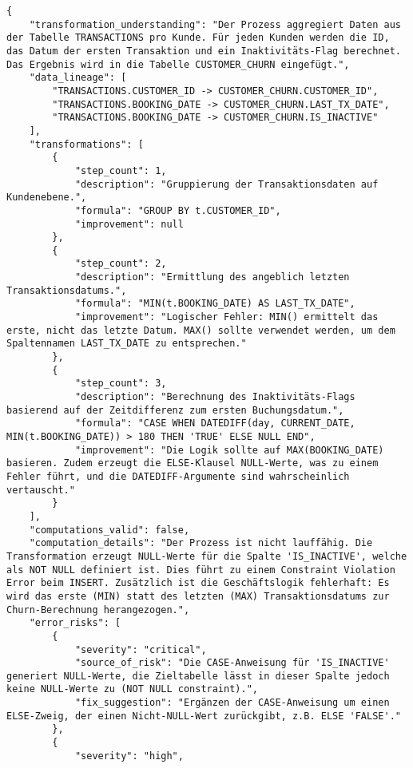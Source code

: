 \begin{lstlisting}[caption={Ausgabe: GEMINI 2.5 Pro Anwendungsfall 7 Hauptdurchlauf},label={gemini_case7_prompt1}]
{
    "transformation_understanding": "Der Prozess aggregiert Daten aus der Tabelle TRANSACTIONS pro Kunde. Für jeden Kunden werden die ID, das Datum der ersten Transaktion und ein Inaktivitäts-Flag berechnet. Das Ergebnis wird in die Tabelle CUSTOMER_CHURN eingefügt.",
    "data_lineage": [
        "TRANSACTIONS.CUSTOMER_ID -> CUSTOMER_CHURN.CUSTOMER_ID",
        "TRANSACTIONS.BOOKING_DATE -> CUSTOMER_CHURN.LAST_TX_DATE",
        "TRANSACTIONS.BOOKING_DATE -> CUSTOMER_CHURN.IS_INACTIVE"
    ],
    "transformations": [
        {
            "step_count": 1,
            "description": "Gruppierung der Transaktionsdaten auf Kundenebene.",
            "formula": "GROUP BY t.CUSTOMER_ID",
            "improvement": null
        },
        {
            "step_count": 2,
            "description": "Ermittlung des angeblich letzten Transaktionsdatums.",
            "formula": "MIN(t.BOOKING_DATE) AS LAST_TX_DATE",
            "improvement": "Logischer Fehler: MIN() ermittelt das erste, nicht das letzte Datum. MAX() sollte verwendet werden, um dem Spaltennamen LAST_TX_DATE zu entsprechen."
        },
        {
            "step_count": 3,
            "description": "Berechnung des Inaktivitäts-Flags basierend auf der Zeitdifferenz zum ersten Buchungsdatum.",
            "formula": "CASE WHEN DATEDIFF(day, CURRENT_DATE, MIN(t.BOOKING_DATE)) > 180 THEN 'TRUE' ELSE NULL END",
            "improvement": "Die Logik sollte auf MAX(BOOKING_DATE) basieren. Zudem erzeugt die ELSE-Klausel NULL-Werte, was zu einem Fehler führt, und die DATEDIFF-Argumente sind wahrscheinlich vertauscht."
        }
    ],
    "computations_valid": false,
    "computation_details": "Der Prozess ist nicht lauffähig. Die Transformation erzeugt NULL-Werte für die Spalte 'IS_INACTIVE', welche als NOT NULL definiert ist. Dies führt zu einem Constraint Violation Error beim INSERT. Zusätzlich ist die Geschäftslogik fehlerhaft: Es wird das erste (MIN) statt des letzten (MAX) Transaktionsdatums zur Churn-Berechnung herangezogen.",
    "error_risks": [
        {
            "severity": "critical",
            "source_of_risk": "Die CASE-Anweisung für 'IS_INACTIVE' generiert NULL-Werte, die Zieltabelle lässt in dieser Spalte jedoch keine NULL-Werte zu (NOT NULL constraint).",
            "fix_suggestion": "Ergänzen der CASE-Anweisung um einen ELSE-Zweig, der einen Nicht-NULL-Wert zurückgibt, z.B. ELSE 'FALSE'."
        },
        {
            "severity": "high",

\end{lstlisting}
